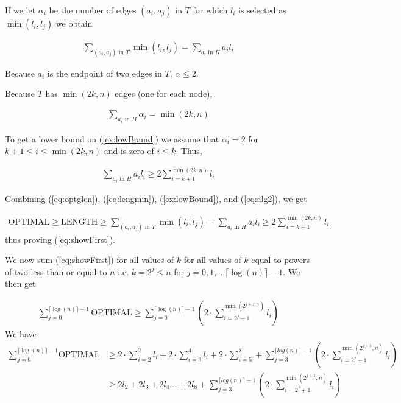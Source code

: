 If we let $\alpha_i$ be the number of edges $(a_i, a_j)$ in $T$ for which $l_i$ is selected as $\min(l_i, l_j)$ we obtain 

\begin{align}
\sum_{(a_i,a_j) \text{ in } T} \min(l_i, l_j) = \sum_{a_i \text{ in } H} a_i l_i  \label{ex:lowBound}
\end{align}

Because $a_i$ is the endpoint of two edges in $T$, $\alpha \leq 2$. 

Because $T$ has $\min(2k,n)$ edges (one for each node),

\begin{align}
\sum_{a_i \text{ in } H} \alpha_i = \min(2k,n) 
\end{align}

To get a lower bound on (\ref{ex:lowBound}) we assume that $\alpha_i = 2 $ for $k+1 \leq i \leq \min(2k,n)$ and is zero of $i \leq k$. Thus,

\begin{align}
\sum_{a_i \text{ in } H} a_i l_i \geq 2 \sum_{i=k+1}^{\min(2k,n)} l_i \label{eq:alg2}
\end{align}

Combining (\ref{eq:optglen}), (\ref{eq:lengmin}), (\ref{ex:lowBound}), and (\ref{eq:alg2}), we get

\begin{align*}
\text{OPTIMAL} \geq \text{LENGTH} \geq \sum_{(a_i,a_j) \text{ in } T} \min(l_i,l_j) = \sum_{a_i \text{ in } H} a_i l_i \geq 2 \sum_{i=k+1}^{\min(2k,n)} l_i
\end{align*}
thus proving (\ref{eq:showFirst}). 

We now sum (\ref{eq:showFirst}) for all values of $k$ for all values of $k$ equal to powers of two less than or equal to $n$ i.e. $k = 2^{j} \leq n$ for $j = 0, 1, \dots \lceil \log(n) \rceil - 1$. We then get

\begin{align*}
\sum_{j=0}^{\lceil \log(n) \rceil -1} \text{OPTIMAL} \geq \sum_{j=0}^{\lceil \log(n) \rceil - 1} ( 2 \cdot \sum_{i=2^j + 1}^{\min(2^{j+1,n})} l_i )
\end{align*}
We have
\begin{align*}
\sum_{j=0}^{\lceil \log(n) \rceil -1} \text{OPTIMAL} &\geq 2 \cdot \sum_{i=2}^2 l_i + 2 \cdot \sum_{i=3}^4 l_i + 2 \cdot \sum_{i=5}^8 + \sum_{j=3}^{\lceil log(n) \rceil - 1} (2 \cdot \sum_{i = 2^j+1}^{\min(2^{j+1},n)} l_i )\\
& \geq 2 l_2 + 2 l_3 + 2 l_4 \dots +2l_8 + \sum_{j=3}^{\lceil log(n) \rceil - 1} (2 \cdot \sum_{i = 2^j+1}^{\min(2^{j+1},n)} l_i)
\end{align*}

